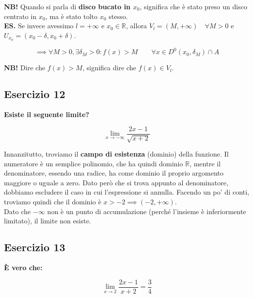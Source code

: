 \documentclass{article}
\begin{document}
\noindent\textbf{NB!} Quando si parla di \textbf{disco bucato in $x_0$}, significa che è stato preso un disco centrato in $x_0$, ma è stato tolto $x_0$ stesso.\\

\noindent\textbf{ES.} Se invece avessimo $l = + \infty$ e $x_0 \in \mathbb{R}$, allora $V_l = (M, + \infty) \quad \forall M > 0$ e $U_{x_0} = (x_0 - \delta, x_0 + \delta)$.

\begin{equation*}
    \implies \forall M > 0, \exists \delta_M > 0 : f(x) > M \qquad \forall x \in D^0(x_0, \delta_M) \cap A
\end{equation*}

\noindent\textbf{NB!} Dire che $f(x) > M$, significa dire che $f(x) \in V_l$.

\subsection{Esercizio 12}
\textbf{Esiste il seguente limite?}

\begin{equation*}
    \lim_{x \to -\infty} \frac{2x-1}{\sqrt{x+2}}
\end{equation*}

\noindent Innanzitutto, troviamo il \textbf{campo di esistenza} (dominio) della funzione. Il numeratore è un semplice polinomio, che ha quindi dominio $\mathbb{R}$, mentre il denominatore, essendo una radice, ha come dominio il proprio argomento maggiore o uguale a zero. Dato però che si trova appunto al denominatore, dobbiamo escludere il caso in cui l'espressione si annulla. Facendo un po' di conti, troviamo quindi che il dominio è $x > -2 \implies (-2, + \infty)$.\\

\noindent Dato che $-\infty$ non è un punto di accumulazione (perché l'insieme è inferiormente limitato), il limite non esiste.

\subsection{Esercizio 13}
\textbf{È vero che:}

\begin{equation*}
    \lim_{x \to 2} \frac{2x-1}{x+2} = \frac{3}{4}
\end{equation*}
\end{document}
